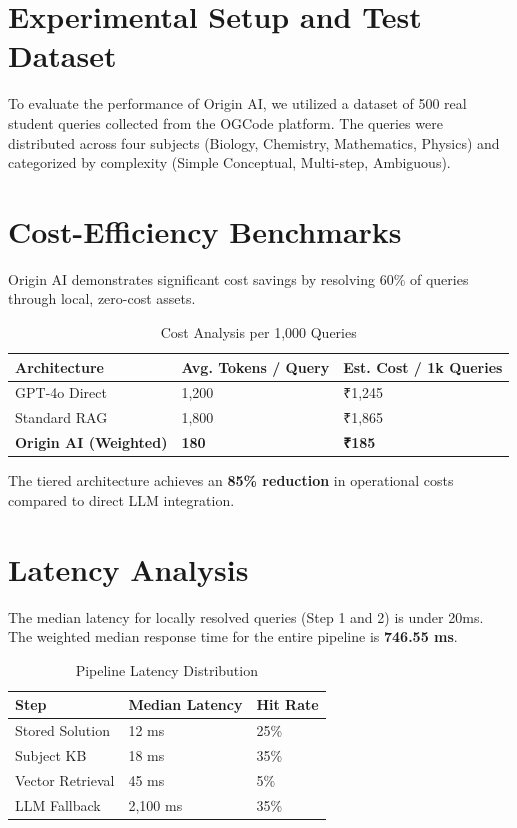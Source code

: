 \section{Experimental Setup and Test Dataset}

To evaluate the performance of Origin AI, we utilized a dataset of 500 real student queries collected from the OGCode platform. The queries were distributed across four subjects (Biology, Chemistry, Mathematics, Physics) and categorized by complexity (Simple Conceptual, Multi-step, Ambiguous).

\section{Cost-Efficiency Benchmarks}

Origin AI demonstrates significant cost savings by resolving 60\% of queries through local, zero-cost assets.

\begin{table}[H]
\centering
\caption{Cost Analysis per 1,000 Queries}
\label{tab:cost_results}
\begin{tabular}{|l|l|l|}
\hline
\textbf{Architecture} & \textbf{Avg. Tokens / Query} & \textbf{Est. Cost / 1k Queries} \\ \hline
GPT-4o Direct & 1,200 & ₹1,245 \\ \hline
Standard RAG & 1,800 & ₹1,865 \\ \hline
\textbf{Origin AI (Weighted)} & \textbf{180} & \textbf{₹185} \\ \hline
\end{tabular}
\end{table}

The tiered architecture achieves an \textbf{85\% reduction} in operational costs compared to direct LLM integration.

\section{Latency Analysis}

The median latency for locally resolved queries (Step 1 and 2) is under 20ms. The weighted median response time for the entire pipeline is \textbf{746.55 ms}.

\begin{table}[H]
\centering
\caption{Pipeline Latency Distribution}
\label{tab:latency}
\begin{tabular}{|l|l|l|}
\hline
\textbf{Step} & \textbf{Median Latency} & \textbf{Hit Rate} \\ \hline
Stored Solution & 12 ms & 25\% \\ \hline
Subject KB & 18 ms & 35\% \\ \hline
Vector Retrieval & 45 ms & 5\% \\ \hline
LLM Fallback & 2,100 ms & 35\% \\ \hline
\end{tabular}
\end{table}

